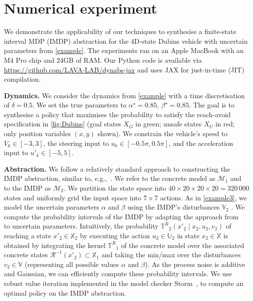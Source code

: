 \documentclass[letterpaper, 10 pt, conference]{ieeeconf}  %
\newcommand*{\States}{\ensuremath{\mathbb{X}}}
\newcommand*{\Actions}{\ensuremath{\mathbb{U}}}
\newcommand*{\Disturb}{\ensuremath{\mathbb{V}}}
\newcommand*{\transfuncR}{\ensuremath{\mathbb{T}^R}}
\newcommand*{\rmdp}{{\ensuremath{\mathcal{M}}}}
\newcommand*{\inv}{\ensuremath{{-1}}}
\newcommand*{\Relation}{\mathcal{R}}
\newcommand*{\Relinv}[1]{\Relation^\inv({#1})}
\begin{document}
\section{Numerical experiment}
\label{sec:experiments}
We demonstrate the applicability of our techniques to synthesise a finite-state interval MDP (IMDP) abstraction for the 4D-state Dubins vehicle with uncertain parameters from \cref{example}.
The experiments ran on an Apple MacBook with an M4 Pro chip and 24GB of RAM.
Our Python code is available via \url{https://github.com/LAVA-LAB/dynabs-jax} and uses JAX %
for just-in-time (JIT) compilation.

\textbf{Dynamics.}
We consider the dynamics from \cref{example} with a time discretisation of $\delta = 0.5$.
We set the true parameters to $\alpha^\star = 0.85$, $\beta^\star = 0.85$.
The goal is to synthesise a policy that maximises the probability to satisfy the reach-avoid specification in \cref{fig:Dubins} (goal states $X_G$ in green; unsafe states $X_U$ in red; only position variables $(x,y)$ shown).
We constrain the vehicle's speed to $V_k \in [-3, 3]$, the steering input to $u_k \in [-0.5\pi, 0.5\pi]$, and the acceleration input to $u'_k \in [-5, 5]$.

\textbf{Abstraction.}
We follow a relatively standard approach to constructing the IMDP abstraction, similar to, e.g.,~\cite{DBLP:conf/hybrid/CauchiLLAKC19,DBLP:conf/hybrid/MathiesenHL25,DBLP:journals/tac/LahijanianAB15}.
We refer to the concrete model as $\rmdp_1$ and to the IMDP as $\rmdp_2$.
We partition the state space into $40 \times 20 \times 20 \times 20 = 320\,000$ states and uniformly grid the input space into $7 \times 7$ actions. %
As in \cref{example3}, we model the uncertain parameters $\alpha$ and $\beta$ using the IMDP's disturbances $\Disturb_2$ .
We compute the probability intervals of the IMDP by adapting the approach from~\cite{DBLP:journals/tac/LahijanianAB15} to uncertain parameters.
Intuitively, the probability $\transfuncR_2(x'_2 \mid x_2, u_2, v_2)$ of reaching a state $x'_2 \in \States_2$ by executing the action $u_2 \in \Actions_2$ in state $x_2 \in \States$ is obtained by integrating the kernel $\transfuncR_1$ of the concrete model over the associated concrete states $\Relinv{x'_2} \subset \States_1$ and taking the min/max over the disturbances $v_2 \in \Disturb$ (representing all possible values $\alpha$ and $\beta$).
As the process noise is additive and Gaussian, we can efficiently compute these probability intervals.
We use robust value iteration implemented in the model checker Storm~\cite{DBLP:conf/cav/DehnertJK017}, to compute an optimal policy on the IMDP abstraction.
\end{document}
